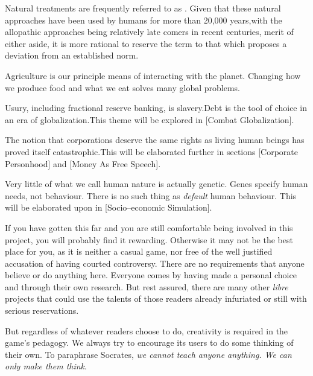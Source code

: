 Natural treatments are frequently referred to as . Given that these natural approaches have been used by humans for more than 20,000 years,\footnotecite[hardy2012] with the allopathic approaches being relatively late comers in recent centuries, merit of either aside, it is more rational to reserve the term  to that which proposes a deviation from an established norm.


Agriculture is our principle means of interacting with the planet. Changing how we produce food and what we eat solves many global problems.\footnotecite[foodwaste]


Usury, including fractional reserve banking, is slavery. Debt is the tool of choice in an era of globalization.\footnotecite[perkins2005] This theme will be explored in [Combat Globalization].


The notion that corporations deserve the same rights as living human beings has proved itself catastrophic. This will be elaborated further in sections \in{}[Corporate Personhood] and \in{}[Money As Free Speech].


Very little of what we call human nature is actually genetic. Genes specify human needs, not behaviour. There is no such thing as {\it default} human behaviour. This will be elaborated upon in [Socio--economic Simulation].
\stopitemize

If you have gotten this far and you are still comfortable being involved in this project, you will probably find it rewarding. Otherwise it may not be the best place for you, as it is neither a casual game, nor free of the well justified accusation of having courted controversy. There are no requirements that anyone believe or do anything here. Everyone comes by having made a personal choice and through their own research. But rest assured, there are many other {\it libre} projects that could use the talents of those readers already infuriated or still with serious reservations.

But regardless of whatever readers choose to do, creativity is required in the game's pedagogy. We always try to encourage its users to do some thinking of their own. To paraphrase Socrates, {\it we cannot teach anyone anything. We can only make them think}.

\StopChapter

